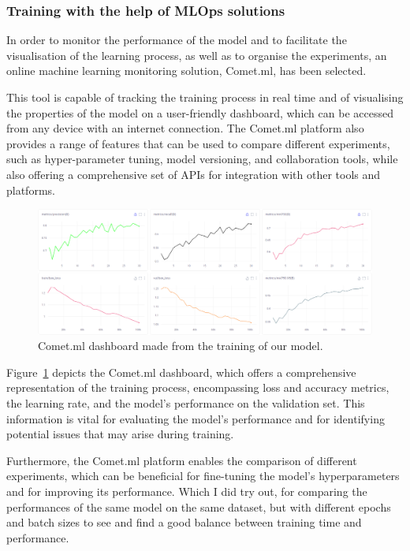 \subsubsection{Training with the help of MLOps solutions}\label{subsec:training-with-the-help-of-mlops-solutions}
In order to monitor the performance of the model and to facilitate the visualisation of the learning process,
as well as to organise the experiments, an online machine learning monitoring solution, Comet.ml, has been selected.

This tool is capable of tracking the training process in real time and of visualising the properties of the model on
a user-friendly dashboard, which can be accessed from any device with an internet connection.
The Comet.ml platform also provides a range of features that can be used to compare different experiments,
such as hyper-parameter tuning, model versioning, and collaboration tools, while also offering a comprehensive
set of APIs for integration with other tools and platforms.

\begin{figure}[ht]
\centering
\includegraphics[width=1.0\textwidth]{figures/model}
\caption{Comet.ml dashboard made from the training of our model.}
\label{fig:comet}
\end{figure}

Figure~\ref{fig:comet} depicts the Comet.ml dashboard, which offers a comprehensive representation of the training process,
encompassing loss and accuracy metrics, the learning rate, and the model's performance on the validation set.
This information is vital for evaluating the model's performance and for identifying potential issues that may arise during training.

Furthermore, the Comet.ml platform enables the comparison of different experiments,
which can be beneficial for fine-tuning the model's hyperparameters and for improving its performance.
Which I did try out, for comparing the performances of the same model on the same dataset,
but with different epochs and batch sizes to see and find a good balance between training time and performance.

